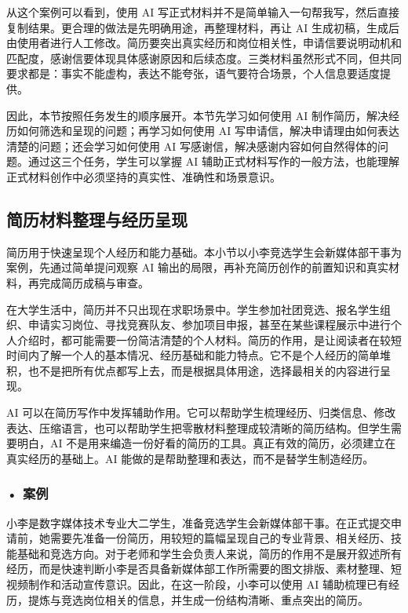 从这个案例可以看到，使用 AI 写正式材料并不是简单输入一句帮我写，然后直接复制结果。更合理的做法是先明确用途，再整理材料，再让 AI 生成初稿，生成后由使用者进行人工修改。简历要突出真实经历和岗位相关性，申请信要说明动机和匹配度，感谢信要体现具体感谢原因和后续态度。三类材料虽然形式不同，但共同要求都是：事实不能虚构，表达不能夸张，语气要符合场景，个人信息要适度提供。

因此，本节按照任务发生的顺序展开。本节先学习如何使用 AI 制作简历，解决经历如何筛选和呈现的问题；再学习如何使用 AI 写申请信，解决申请理由如何表达清楚的问题；还会学习如何使用 AI 写感谢信，解决感谢内容如何自然得体的问题。通过这三个任务，学生可以掌握 AI 辅助正式材料写作的一般方法，也能理解正式材料创作中必须坚持的真实性、准确性和场景意识。


\subsection{简历材料整理与经历呈现}

简历用于快速呈现个人经历和能力基础。本小节以小李竞选学生会新媒体部干事为案例，先通过简单提问观察 AI 输出的局限，再补充简历创作的前置知识和真实材料，再完成简历成稿与审查。

在大学生活中，简历并不只出现在求职场景中。学生参加社团竞选、报名学生组织、申请实习岗位、寻找竞赛队友、参加项目申报，甚至在某些课程展示中进行个人介绍时，都可能需要一份简洁清楚的个人材料。简历的作用，是让阅读者在较短时间内了解一个人的基本情况、经历基础和能力特点。它不是个人经历的简单堆积，也不是把所有优点都写上去，而是根据具体用途，选择最相关的内容进行呈现。

AI 可以在简历写作中发挥辅助作用。它可以帮助学生梳理经历、归类信息、修改表达、压缩语言，也可以帮助学生把零散材料整理成较清晰的简历结构。但学生需要明白，AI 不是用来编造一份好看的简历的工具。真正有效的简历，必须建立在真实经历的基础上。AI 能做的是帮助整理和表达，而不是替学生制造经历。

\subsubsection*{\textbf{• 案例}}

小李是数字媒体技术专业大二学生，准备竞选学生会新媒体部干事。在正式提交申请前，她需要先准备一份简历，用较短的篇幅呈现自己的专业背景、相关经历、技能基础和竞选方向。对于老师和学生会负责人来说，简历的作用不是展开叙述所有经历，而是快速判断小李是否具备新媒体部工作所需要的图文排版、素材整理、短视频制作和活动宣传意识。因此，在这一阶段，小李可以使用 AI 辅助梳理已有经历，提炼与竞选岗位相关的信息，并生成一份结构清晰、重点突出的简历。


